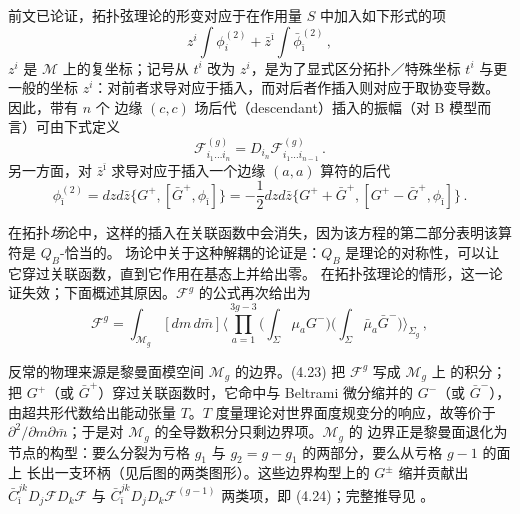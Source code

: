 前文已论证，拓扑弦理论的形变对应于在作用量 $S$ 中加入如下形式的项
\[
  z^i\int\phi_i^{(2)}+\bar z^{\bar\imath}\int\bar\phi_{\bar\imath}^{(2)}\,,
\]
$z^i$ 是 $\mathcal{M}$ 上的复坐标；记号从 $t^i$ 改为 $z^i$，是为了显式区分拓扑／特殊坐标 $t^i$ 与更
一般的坐标 $z^i$：对前者求导对应于插入，而对后者作插入则对应于取协变导数。因此，带有 $n$ 个
边缘 $(c,c)$ 场后代（descendant）插入的振幅（对 B 模型而言）可由下式定义 \cite{ref19}
\begin{equation}
  \mathcal{F}^{(g)}_{i_1\ldots i_n}=D_{i_n}\mathcal{F}^{(g)}_{i_1\ldots i_{n-1}}\,.
  \tag{4.21}
  \label{eq:4.21}
\end{equation}
另一方面，对 $\bar z^{\bar\imath}$ 求导对应于插入一个边缘 $(a,a)$ 算符的后代
\begin{equation}
  \phi_{\bar\imath}^{(2)}=dzd\bar z\{G^+,[\bar G^+,\phi_{\bar\imath}]\}
  =-\frac12 dzd\bar z\{G^++\bar G^+,[G^+-\bar G^+,\phi_{\bar\imath}]\}\,.
  \tag{4.22}
  \label{eq:4.22}
\end{equation}


在拓扑\emph{场}论中，这样的插入在关联函数中会消失，因为该方程的第二部分表明该算符是 $Q_B$-恰当的。
场论中关于这种解耦的论证是：$Q_B$ 是理论的对称性，可以让它穿过关联函数，直到它作用在基态上并给出零。
在拓扑弦理论的情形，这一论证失效；下面概述其原因。$\mathcal{F}^g$ 的公式再次给出为
\begin{equation}
  \mathcal{F}^g=\int_{\mathcal{M}_g}[dm\,d\bar m]
  \Big\langle\prod_{a=1}^{3g-3}\Big(\int_\Sigma\mu_aG^-\Big)
  \Big(\int_\Sigma\bar\mu_a\bar G^-\Big)\Big\rangle_{\Sigma_g}\,,
  \tag{4.23}
  \label{eq:4.23}
\end{equation}

\begin{yizhu}[物理图像]
反常的物理来源是黎曼面模空间 $\mathcal{M}_g$ 的边界。(4.23) 把 $\mathcal{F}^g$ 写成 $\mathcal{M}_g$ 上
的积分；把 $G^+$（或 $\bar G^+$）穿过关联函数时，它命中与 Beltrami 微分缩并的 $G^-$（或 $\bar G^-$），
由超共形代数给出能动张量 $T$。$T$ 度量理论对世界面度规变分的响应，故等价于
$\partial^2/\partial m\partial\bar m$；于是对 $\mathcal{M}_g$ 的全导数积分只剩边界项。$\mathcal{M}_g$ 的
边界正是黎曼面退化为节点的构型：要么分裂为亏格 $g_1$ 与 $g_2=g-g_1$ 的两部分，要么从亏格 $g-1$ 的面上
长出一支环柄（见后图的两类图形）。这些边界构型上的 $G^\pm$ 缩并贡献出
$\bar C^{jk}_{\bar\imath}D_j\mathcal{F}D_k\mathcal{F}$ 与 $\bar C^{jk}_{\bar\imath}D_jD_k
\mathcal{F}^{(g-1)}$ 两类项，即 (4.24)；完整推导见 \cite{ref18,ref19}。
\end{yizhu}

